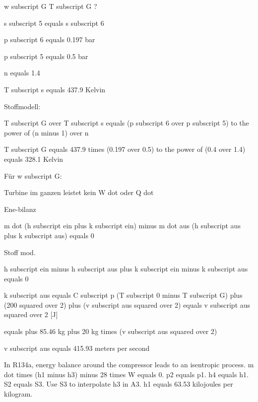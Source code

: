w subscript G T subscript G ?

s subscript 5 equals s subscript 6

p subscript 6 equals 0.197 bar

p subscript 5 equals 0.5 bar

n equals 1.4

T subscript s equals 437.9 Kelvin

Stoffmodell:

T subscript G over T subscript s equals (p subscript 6 over p subscript 5) to the power of (n minus 1) over n

T subscript G equals 437.9 times (0.197 over 0.5) to the power of (0.4 over 1.4) equals 328.1 Kelvin

Für w subscript G:

Turbine im ganzen leistet kein W dot oder Q dot

Ene-bilanz

m dot (h subscript ein plus k subscript ein) minus m dot aus (h subscript aus plus k subscript aus) equals 0

Stoff mod.

h subscript ein minus h subscript aus plus k subscript ein minus k subscript aus equals 0

k subscript aus equals C subscript p (T subscript 0 minus T subscript G) plus (200 squared over 2) plus (v subscript aus squared over 2) equals v subscript aus squared over 2 [J]

equals plus 85.46 kg plus 20 kg times (v subscript aus squared over 2)

v subscript aus equals 415.93 meters per second

In R134a, energy balance around the compressor leads to an isentropic process. m dot times (h1 minus h3) minus 28 times W equals 0. p2 equals p1. h4 equals h1. S2 equals S3. Use S3 to interpolate h3 in A3. h1 equals 63.53 kilojoules per kilogram.